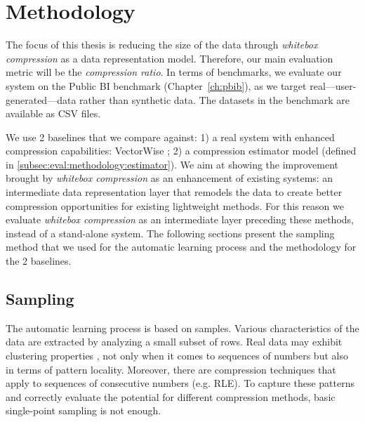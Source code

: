 \section{Methodology}
\label{sec:eval:methodology}



\graphicspath{{6_evaluation/images/}}

% 

The focus of this thesis is reducing the size of the data through \textit{whitebox compression} as a data representation model. Therefore, our main evaluation metric will be the \textit{compression ratio}. In terms of benchmarks, we evaluate our system on the Public BI benchmark (Chapter~\ref{ch:pbib}), as we target real---user-generated---data rather than synthetic data. The datasets in the benchmark are available as CSV files.

We use 2 baselines that we compare against: 1) a real system with enhanced compression capabilities: VectorWise \cite{zukowski2012vectorwise}; 2) a compression estimator model (defined in \ref{subsec:eval:methodology:estimator}). We aim at showing the improvement brought by \textit{whitebox compression} as an enhancement of existing systems: an intermediate data representation layer that remodels the data to create better compression opportunities for existing lightweight methods. For this reason we evaluate \textit{whitebox compression} as an intermediate layer preceding these methods, instead of a stand-alone system. The following sections present the sampling method that we used for the automatic learning process and the methodology for the 2 baselines.

\iffalse
good words: "prior to"
\fi



\subsection{Sampling}
\label{subsec:eval:methodology:sampling}

The automatic learning process is based on samples. Various characteristics of the data are extracted by analyzing a small subset of rows. Real data may exhibit clustering properties \cite{sidirourgos2013column}, not only when it comes to sequences of numbers but also in terms of pattern locality. Moreover, there are compression techniques that apply to sequences of consecutive numbers (e.g. RLE). To capture these patterns and correctly evaluate the potential for different compression methods, basic single-point sampling is not enough.

